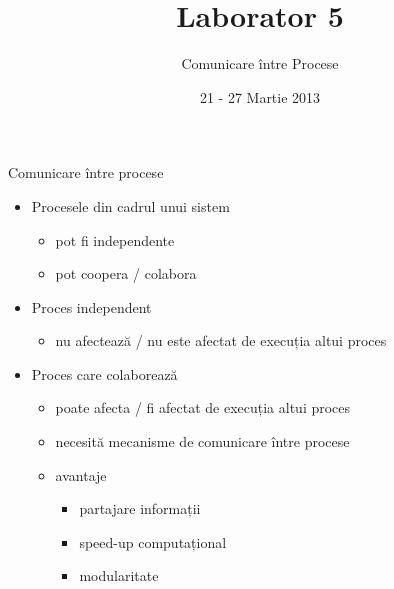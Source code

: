 \documentclass{so.cs.pub.ro}
\title[Laborator 5]{Laborator 5}
\subtitle{Comunicare între Procese}
\date{21 - 27 Martie 2013}
\begin{document}
\frame{\titlepage}

\begin{frame}{Comunicare între procese}
        \begin{itemize}
        \item Procesele din cadrul unui sistem
        \begin{itemize}
        		\item pot fi independente
        		\item pot coopera / colabora
        \end{itemize}  
        		\vspace{0.3cm}
        \item Proces independent
        \begin{itemize}
        		\item nu afectează / nu este afectat de execuția altui proces 
        \end{itemize}
        		\vspace{0.3cm}
        \item Proces care colaborează
        \begin{itemize}
            \item poate afecta / fi afectat de execuția altui proces 
        		\item necesită mecanisme de comunicare între procese
        		\item avantaje
		      \begin{itemize}
        			\item partajare informații
        			\item speed-up computațional
        			\item modularitate
        		\end{itemize}        		
        \end{itemize}
      \end{itemize}
\end{frame}
\end{document}
